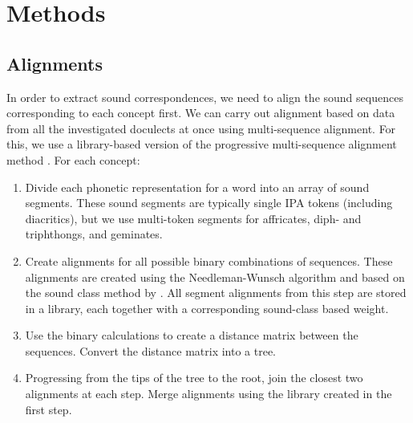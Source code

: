 \documentclass{article}
\begin{document}
\section{Methods}

\subsection{Alignments}
\label{s:alignments}

In order to extract sound correspondences, we need to align the sound sequences corresponding to each concept first.
We can carry out alignment based on data from all the investigated doculects at once using multi-sequence alignment.
For this, we use a library-based version \citet{notredame2000t-coffee:} of the progressive multi-sequence alignment method \citet{thompson1994clustal}.
For each concept:


\begin{enumerate}
\item
Divide each phonetic representation for a word into an array of sound segments.
These sound segments are typically single IPA tokens (including diacritics), but we use multi-token segments for affricates, diph- and triphthongs, and geminates.

\item
Create alignments for all possible binary combinations of sequences.
These alignments are created using the Needleman-Wunsch algorithm \citep{needleman1970general} and based on the sound class method by \citet{list2012sca:}.
All segment alignments from this step are stored in a library, each together with a corresponding sound-class based weight. %

\item
Use the binary calculations to create a distance matrix between the sequences.
Convert the distance matrix into a tree. %

\item 
Progressing from the tips of the tree to the root, join the closest two alignments at each step.
Merge alignments using the library created in the first step.
\end{enumerate}
\end{document}
